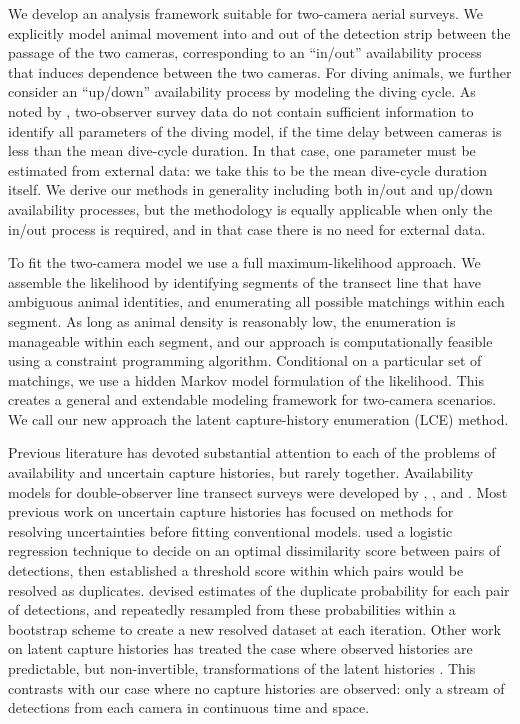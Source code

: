\documentclass[useAMS, usenatbib, referee]{biom}\usepackage[]{graphicx}\usepackage[]{color}
\begin{document}
We develop an analysis framework suitable for two-camera aerial surveys. We explicitly model animal movement into and out of the detection strip between the passage of the two cameras, corresponding to an ``in/out'' availability process that induces dependence between the two cameras. For diving animals, we further consider an ``up/down'' availability process by modeling the diving cycle. As noted by \cite{Stevenson+al:19}, two-observer survey data do not contain sufficient information to identify all parameters of the diving model, if the time delay between cameras is less than the mean dive-cycle duration. In that case, one parameter must be estimated from external data: we take this to be the mean dive-cycle duration itself. We derive our methods in generality including both in/out and up/down availability processes, but the methodology is equally applicable when only the in/out process is required, and in that case there is no need for external data.

To fit the two-camera model we use a full maximum-likelihood approach. We assemble the likelihood by identifying segments of the transect line that have ambiguous animal identities, and enumerating all possible matchings within each segment. As long as animal density is reasonably low, the enumeration is manageable within each segment, and our approach is computationally feasible using a constraint programming algorithm. Conditional on a particular set of matchings, we use a hidden Markov model formulation of the likelihood. This creates a general and extendable modeling framework for two-camera scenarios. We call our new approach the latent capture-history enumeration (LCE) method.


Previous literature has devoted substantial attention to each of the problems of availability and uncertain capture histories, but rarely together. Availability models for double-observer line transect surveys were developed by \cite{Borchers+al:13}, \cite{Langrock+al:13}, and \cite{Borchers+Langrock:15}. Most previous work on uncertain capture histories has focused on methods for resolving uncertainties before fitting conventional models. \cite{Pike+DoniolValcroze:15} used a logistic regression technique to decide on an optimal dissimilarity score between pairs of detections, then established a threshold score within which pairs would be resolved as duplicates. \cite{Hamilton+al:18} devised estimates of the duplicate probability for each pair of detections, and repeatedly resampled from these probabilities within a bootstrap scheme to create a new resolved dataset at each iteration. Other work on latent capture histories has treated the case where observed histories are predictable, but non-invertible, transformations of the latent histories \citep[e.g.][]{Zhang+al:19,Bonner+Holmberg:13,Link+al:10}. This contrasts with our case where no capture histories are observed: only a stream of detections from each camera in continuous time and space.
\end{document}
